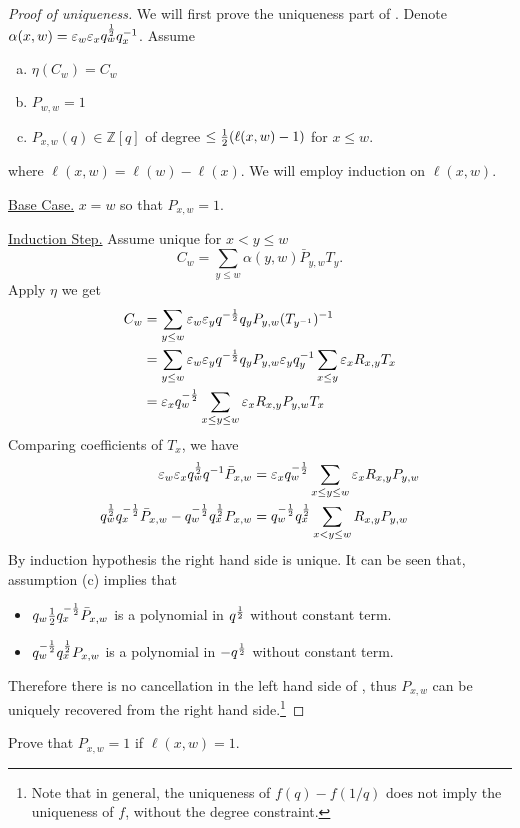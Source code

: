 \begin{proof}[Proof of uniqueness]
We will first prove the uniqueness part of . Denote $\alpha(x,w)=\varepsilon_w\varepsilon_x q_w^{1\over 2}q_x^{-1}$. Assume%
\begin{enumerate}[(a),noitemsep]
	\item $\eta(C_w)=C_w$
	\item $P_{w,w}=1$
	\item $P_{x,w}(q)\in\mathbb{Z}[q]$ of degree $\leq {1\over 2}(\ell(x,w)-1)$ for $x\leq w$.
\end{enumerate}

where $\ell(x,w)=\ell(w)-\ell(x)$. We will employ induction on $\ell(x,w)$.

\underline{Base Case.} $x=w$ so that $P_{x,w}=1$.

\underline{Induction Step.}	Assume unique for $x<y\leq w$
\[C_w=\sum_{y\leq w}\alpha(y,w)\bar P_{y,w} T_y.\]
Apply $\eta$ we get
\begin{align*}\label{eq:uniq_proof}
C_w&=\sum_{y\leq w}\varepsilon_w\varepsilon_y q^{-{1\over 2} }q_yP_{y,w}(T_{y^{-1}})^{-1}\\&=\sum_{y\leq w} \varepsilon_w\varepsilon_y q^{-{1\over 2} } q_yP_{y,w}\varepsilon_yq_y^{-1}\sum_{x\leq y}\varepsilon_x R_{x,y} T_x\\
&=\varepsilon_xq_w^{-{1\over 2}}\sum_{x\leq y\leq w}\varepsilon_x R_{x,y} P_{y,w} T_x
\end{align*}
Comparing coefficients of $T_x$, we have
\begin{align}
\nonumber\varepsilon_w\varepsilon_xq_w^{1\over 2}q^{-1}\bar P_{x,w}&=\varepsilon_x q_w^{-{1\over 2}}\sum_{x\leq y\leq w}\varepsilon_x R_{x,y} P_{y,w}\\
	q_w^{1\over 2} q_x^{-{1\over 2}}\bar P_{x,w}-q_w^{-{1\over 2}} q_x^{1\over 2} P_{x,w}&=q_w^{-{1\over 2}}q_x^{1\over 2}\sum_{x<y\leq w}R_{x,y}P_{y,w}
\end{align}
By induction hypothesis the right hand side is unique. It can be seen that, assumption (c) implies that
\begin{itemize}
	\item $q_w{1\over 2}q_x^{-{1\over 2}}\bar P_{x,w}$ is a polynomial in $q^{1\over 2}$ without constant term.
	\item $q_w^{-{1\over 2}}q_x^{{1\over 2}} P_{x,w}$ is a polynomial in $-q^{1\over 2}$ without constant term.
\end{itemize}
Therefore there is no cancellation in the left hand side of , thus $P_{x,w}$ can be uniquely recovered from the right hand side.\footnote{Note that in general, the uniqueness of $f(q)-f(1/q)$ does not imply the uniqueness of $f$, without the degree constraint.
}

\end{proof}
\begin{exercise}
	Prove that $P_{x,w}=1$ if $\ell(x,w)=1$.
\end{exercise}

